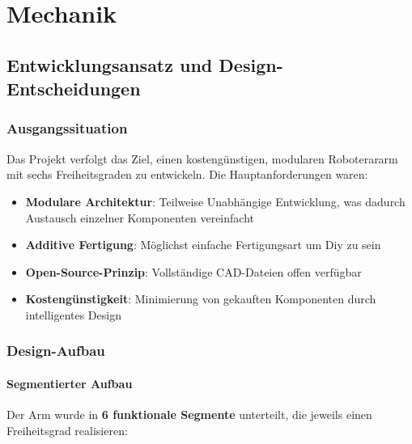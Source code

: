 \chapter{Mechanik}
\label{sec:hardware}

\section{Entwicklungsansatz und Design-Entscheidungen}

\subsection{Ausgangssituation}

Das Projekt verfolgt das Ziel, einen kostengünstigen, modularen Roboterararm mit sechs Freiheitsgraden zu entwickeln. Die Hauptanforderungen waren:

\begin{itemize}
	\item \textbf{Modulare Architektur}: Teilweise Unabhängige Entwicklung, was dadurch Austausch einzelner Komponenten vereinfacht
	\item \textbf{Additive Fertigung}: Möglichst einfache Fertigungsart um Diy zu sein
	\item \textbf{Open-Source-Prinzip}: Vollständige CAD-Dateien offen verfügbar
	\item \textbf{Kostengünstigkeit}: Minimierung von gekauften Komponenten durch intelligentes Design
\end{itemize}

\subsection{Design-Aufbau}

\subsubsection{Segmentierter Aufbau}

Der Arm wurde in \textbf{6 funktionale Segmente} unterteilt, die jeweils einen Freiheitsgrad realisieren:

